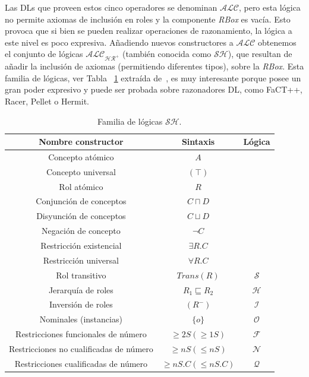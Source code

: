 Las DLs que proveen estos cinco operadores se denominan $\mathcal{ALC}$, pero
esta lógica no permite axiomas de inclusión en roles y la componente 
\textit{RBox} es vacía. Esto provoca que si bien se pueden realizar operaciones
de razonamiento, la lógica a este nivel es poco expresiva. Añadiendo nuevos
constructores a $\mathcal{ALC}$ obtenemos el conjunto de lógicas
$\mathcal{ALC_{HR^+}}$ (también conocida como $\mathcal{SH}$), que resultan de añadir la
inclusión de axiomas (permitiendo diferentes tipos), sobre la \textit{RBox}.
Esta familia de lógicas, ver Tabla ~\ref{table:sh} extraída de~\cite{Cuenca}, es muy
interesante porque posee un gran poder expresivo y puede ser probada sobre razonadores DL, como FaCT++, Racer, Pellet o Hermit.


\begin{table}[htb]
\renewcommand{\arraystretch}{1.3}
\begin{center}
\begin{tabular}{|c|c|c|}
\hline
\textbf{Nombre constructor}&\textbf{Sintaxis}&\textbf{Lógica}\\
\hline
Concepto atómico& $A$ & \\
Concepto universal& $(\top)$ & \\
Rol atómico& $R$ & \\
Conjunción de conceptos& $C \sqcap D$ & \\
Disyunción de conceptos& $C \sqcup D$ & \\
Negación de concepto& $\neg C$ & \\
Restricción existencial& $\exists R.C$ & \\
Restricción universal& $\forall R.C$ & \\
Rol transitivo& $Trans(R)$ & $\mathcal{S}$\\
\hline
Jerarquía de roles& $R_1 \sqsubseteq R_2$ & $\mathcal{H}$\\
\hline
Inversión de roles& $(R^-)$ & $\mathcal{I}$\\
\hline
Nominales (instancias)& $\{o\}$ & $\mathcal{O}$\\
\hline
Restricciones funcionales de número& $\geq 2S  (\geq 1S)$ &
$\mathcal{F}$\\ \hline

Restricciones no cualificadas de número& $\geq nS  (\leq nS)$ &
$\mathcal{N}$\\ 

\hline

Restricciones cualificadas de número& $\geq nS.C  (\leq nS.C)$ &
$\mathcal{Q}$\\ 

\hline
\hline

\end{tabular}
\caption{Familia de lógicas $\mathcal{SH}$.}
\label{table:sh}
\end{center}
\end{table}

